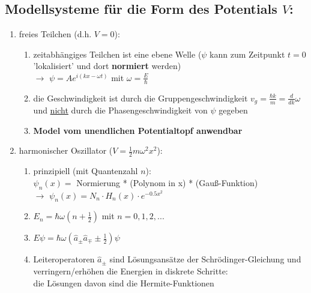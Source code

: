 \subsection{Modellsysteme für die Form des Potentials $V$:}
\begin{enumerate}
    \item freies Teilchen (d.h. $V=0$):
    \begin{enumerate}
        \item zeitabhängiges Teilchen ist eine ebene Welle ($\psi$ kann zum Zeitpunkt $t=0$ 'lokalisiert'  
        und dort \textbf{normiert} werden) \\
        $\rightarrow$ $\psi =Ae^{i(kx-\omega t)}$ mit $\omega=\frac{E}{\hbar}$
        \item die Geschwindigkeit ist durch die Gruppengeschwindigkeit $v_g=\frac{\hbar k}{m}=\frac{d}{dk}\omega$ und \underline{nicht}
        durch die Phasengeschwindigkeit von $\psi$ gegeben
        \item \textbf{Model vom unendlichen Potentialtopf anwendbar}  
    \end{enumerate}
    \item harmonischer Oszillator ($V=\frac{1}{2}m\omega^2x^2$):
    \begin{enumerate}
        \item prinzipiell (mit Quantenzahl $n$):\\
        $\psi_n(x)=$ Normierung * (Polynom in x) * (Gauß-Funktion)\\
        $\rightarrow$ $\psi_n(x)=N_n\cdot H_n(x) \cdot e^{-0.5x^2}$
        \item $E_n=\hbar\omega(n+\frac{1}{2})$ mit $n=0,1,2,...$
        \item $E\psi=\hbar\omega(\hat{a}_\pm\hat{a}_\mp\pm\frac{1}{2})\psi$
        \item Leiteroperatoren $\hat{a}_\pm$ sind Lösungsansätze der Schrödinger-Gleichung und 
        verringern/erhöhen die Energien in diskrete Schritte: \\ die Lösungen davon sind die Hermite-Funktionen
    \end{enumerate}
\end{enumerate}




\newpage